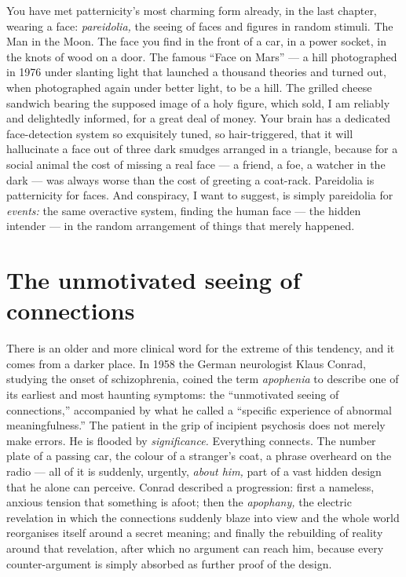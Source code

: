 You have met patternicity's most charming form already, in the last chapter, wearing a face: \emph{pareidolia,} the seeing of faces and figures in random stimuli. The Man in the Moon. The face you find in the front of a car, in a power socket, in the knots of wood on a door. The famous ``Face on Mars'' — a hill photographed in 1976 under slanting light that launched a thousand theories and turned out, when photographed again under better light, to be a hill. The grilled cheese sandwich bearing the supposed image of a holy figure, which sold, I am reliably and delightedly informed, for a great deal of money. Your brain has a dedicated face-detection system so exquisitely tuned, so hair-triggered, that it will hallucinate a face out of three dark smudges arranged in a triangle, because for a social animal the cost of missing a real face — a friend, a foe, a watcher in the dark — was always worse than the cost of greeting a coat-rack. Pareidolia is patternicity for faces. And conspiracy, I want to suggest, is simply pareidolia for \emph{events:} the same overactive system, finding the human face — the hidden intender — in the random arrangement of things that merely happened.

\section*{The unmotivated seeing of connections}

There is an older and more clinical word for the extreme of this tendency, and it comes from a darker place. In 1958 the German neurologist Klaus Conrad, studying the onset of schizophrenia, coined the term \emph{apophenia} to describe one of its earliest and most haunting symptoms: the ``unmotivated seeing of connections,'' accompanied by what he called a ``specific experience of abnormal meaningfulness.'' The patient in the grip of incipient psychosis does not merely make errors. He is flooded by \emph{significance.} Everything connects. The number plate of a passing car, the colour of a stranger's coat, a phrase overheard on the radio — all of it is suddenly, urgently, \emph{about him,} part of a vast hidden design that he alone can perceive. Conrad described a progression: first a nameless, anxious tension that something is afoot; then the \emph{apophany,} the electric revelation in which the connections suddenly blaze into view and the whole world reorganises itself around a secret meaning; and finally the rebuilding of reality around that revelation, after which no argument can reach him, because every counter-argument is simply absorbed as further proof of the design.

